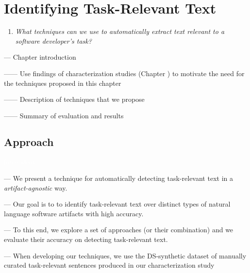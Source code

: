 \setcounter{chapter}{4}
\setcounter{rq}{1}


\chapter{Identifying Task-Relevant Text}
\label{ch:identifying}



\vspace{1mm}

\begin{enumerate}[label=\textit{RQ\arabic*},leftmargin=1.4cm]

\item \textit{What techniques can we use to automatically extract text relevant to a software developer's task?} 

\end{enumerate}

\vspace{1mm}

--- Chapter introduction 

------ Use findings of characterization studies (Chapter ) to motivate the need for the techniques proposed in this chapter

------ Description of techniques that we propose


------ Summary of evaluation and results



\clearpage


\section{Approach}
\textcolor{white}{force ident} %

--- We present a technique for automatically detecting task-relevant text in a \textit{artifact-agnostic} way. \vspace{3mm}

--- Our goal is to to identify task-relevant text over distinct types of natural language software artifacts with high accuracy.  \vspace{3mm}

--- To this end, we explore a set of approaches (or their combination) and we evaluate their accuracy on detecting task-relevant text. 

--- When developing our techniques, we use the \acs{DS-synthetic} dataset of manually curated task-relevant sentences produced in our characterization study~\cite{marques2020} \vspace{3mm}


